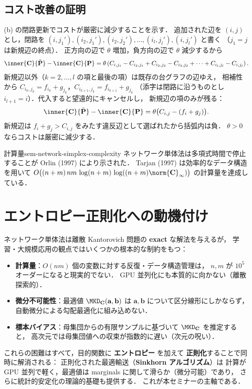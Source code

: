 \subsection{コスト改善の証明}
\label{subsec:sem-simplex-improvement}

(b) の閉路更新でコストが厳密に減少することを示す．
追加された辺を $(i, j)$ とし，閉路を
$(i, j_1'), (i_2, j_1'), (i_2, j_2'), \ldots, (i_l, j_l'), (i, j_l')$ と書く
（$j_1 = j$ は新規辺の終点）．
正方向の辺で $\theta$ 増加，負方向の辺で $\theta$ 減少するから
\[
  \inner{\mathbf{C}}{\tilde{\mathbf{P}}} - \inner{\mathbf{C}}{\mathbf{P}}
  = \theta \left(
    C_{i, j_1} - C_{i_2, j_1}
    + C_{i_2, j_2} - C_{i_3, j_2}
    + \cdots
    + C_{i_l, j_l} - C_{i, j_l}
  \right).
\]
新規辺以外（$k = 2, \ldots, l$ の項と最後の項）は既存の台グラフの辺ゆえ，
相補性から $C_{i_k, j_k} = f_{i_k} + g_{j_k}$，$C_{i_{k+1}, j_k} = f_{i_{k+1}} + g_{j_k}$
（添字は閉路に沿うものとし $i_{l+1} = i$）．代入すると望遠的にキャンセルし，
新規辺の項のみが残る：
\[
  \inner{\mathbf{C}}{\tilde{\mathbf{P}}} - \inner{\mathbf{C}}{\mathbf{P}}
  = \theta\bigl( C_{i, j} - (f_i + g_j) \bigr).
\]
新規辺は $f_i + g_j > C_{i, j}$ をみたす違反辺として選ばれたから括弧内は負．
$\theta > 0$ ならコストは厳密に減少する．

\begin{remark}{計算量}{sem-network-simplex-complexity}
  ネットワーク単体法は多項式時間で停止することが Orlin (1997) により示された．
  Tarjan (1997) は効率的なデータ構造を用いて
  $O\bigl((n+m)\,nm\,\log(n+m)\,\log((n+m)\norm{\mathbf{C}}_\infty)\bigr)$
  の計算量を達成している．
\end{remark}

\section{エントロピー正則化への動機付け}
\label{sec:sem-motivation-entropic}

ネットワーク単体法は離散 Kantorovich 問題の \textbf{exact} な解法を与えるが，
学習・大規模応用の観点ではいくつかの根本的な制約をもつ：

\begin{itemize}
  \item \textbf{計算量}：$O(nm)$ 個の変数に対する反復・データ構造管理は，
    $n, m$ が $10^5$ オーダーになると現実的でない．
    GPU 並列化にも本質的に向かない（離散探索的）．
  \item \textbf{微分不可能性}：最適値 $\MKD_{\mathbf{C}}(\mathbf{a}, \mathbf{b})$ は
    $\mathbf{a}, \mathbf{b}$ について区分線形にしかならず，
    自動微分による勾配最適化に組み込めない．
  \item \textbf{標本バイアス}：母集団からの有限サンプルに基づいて
    $\MKD_{\mathbf{C}}$ を推定すると，
    高次元では母集団値への収束が指数的に遅い（次元の呪い）．
\end{itemize}

これらの困難はすべて，目的関数に \textbf{エントロピー} を加えて
\textbf{正則化}することで同時に解消される：
正則化された最適輸送（\textbf{Sinkhorn アルゴリズム}）は
計算が GPU 並列で軽く，最適値は marginals に関して滑らか（微分可能）であり，
さらに統計的安定化の理論的基礎も提供する．
これが本セミナーの主軸である．
